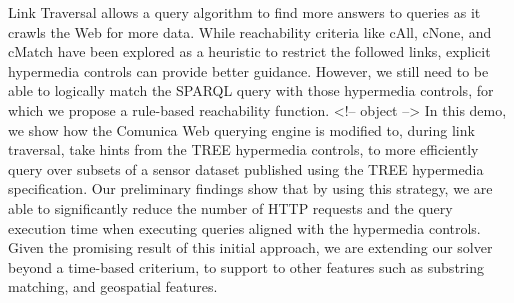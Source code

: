 Link Traversal allows a query algorithm to find more answers to queries as it crawls the Web for more data.
While reachability criteria like cAll, cNone, and cMatch have been explored as a heuristic to restrict the followed links,
explicit hypermedia controls can provide better guidance.
However, we still need to be able to logically match the SPARQL query with those hypermedia controls, for which we propose a rule-based reachability function.
<!-- object -->
In this demo, we show how the Comunica Web querying engine is modified to, during link traversal, take hints from the TREE hypermedia controls, to more efficiently query over subsets of a sensor dataset published using the TREE hypermedia specification.
Our preliminary findings show that by using this strategy,
we are able to significantly reduce the number of HTTP requests and the query execution time
when executing queries aligned with the hypermedia controls.
Given the promising result of this initial approach,
we are extending our solver beyond a time-based criterium, to support to other features such as substring matching, and geospatial features.
